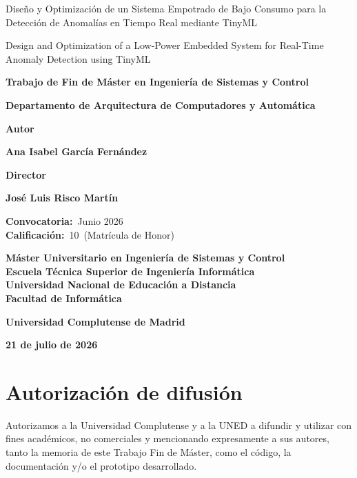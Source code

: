 \documentclass[11pt,a4paper]{book}
\newcommand{\miAutor}{Ana Isabel García Fernández}
\newcommand{\miDirector}{José Luis Risco Martín}
\newcommand{\miTituloES}{Diseño y Optimización de un Sistema Empotrado de Bajo Consumo para la Detección de Anomalías en Tiempo Real mediante TinyML}
\newcommand{\miTituloEN}{Design and Optimization of a Low-Power Embedded System for Real-Time Anomaly Detection using TinyML}
\newcommand{\misEstudios}{Máster Universitario en Ingeniería de Sistemas y Control}
\newcommand{\miTFXyEstudios}{Trabajo de Fin de Máster en Ingeniería de Sistemas y Control}
\newcommand{\miDepartamento}{Departamento de Arquitectura de Computadores y Automática}
\newcommand{\miConvocatoria}{Junio 2026}
\newcommand{\miNota}{10}
\newcommand{\miCalificacion}{Matrícula de Honor}
\newcommand{\miFecha}{21 de julio de 2026}
\begin{document}
\cleardoublepage
\thispagestyle{empty}
\begin{center}
\vspace*{1cm}

{\Huge {\miTituloES}} \\
{\Huge {\miTituloEN} \par}

\vspace*{2.5cm}

{\large \textbf{\miTFXyEstudios}} \\
{\large \textbf{\miDepartamento} \par}

\vspace{1cm}

{\Large \textbf{Autor}} \\
{\large \textbf{\miAutor} \par}

\vspace{0.50cm}

{\Large \textbf{Director}} \\
{\large \textbf{\miDirector} \par}

\vspace{0.75cm}\vfill

{\large \textbf{Convocatoria:}~\miConvocatoria}\\
{\large \textbf{Calificación:}~\miNota~(\miCalificacion)}

\vspace{1.00cm}\vfill

{\large \textbf{\misEstudios}}\\
{\large \textbf{Escuela Técnica Superior de Ingeniería Informática}}\\
{\large \textbf{Universidad Nacional de Educación a Distancia}}\\
{\large \textbf{Facultad de Informática}}\\
{\large \textbf{Universidad Complutense de Madrid} \par}
{\large \textbf{\miFecha}}
\end{center}

\chapter*{Autorización de difusión}
Autorizamos a la Universidad Complutense y a la UNED a difundir y utilizar con fines académicos, no comerciales y mencionando expresamente a sus autores, tanto la memoria de este Trabajo Fin de Máster, como el código, la documentación y/o el prototipo desarrollado.
\end{document}
